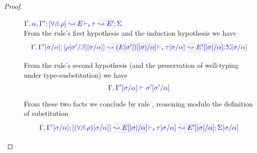 \begin{proof}
\begin{description}
\item[]\quad$\dmres{\tenv,\alpha,\tenv'}{\tall{\beta}{\rulet}}{E}{\type}{E'}{\Sigma}$\\

  From the rule's first hypothesis and the induction hypothesis we have 
\begin{equation*}
  \dmres{\tenv,\tenv'[\suty/\alpha]}{\rulet[\suty'/\beta][\suty/\alpha]}{(E |\suty'|)[|\suty|/\alpha]}{\type[\suty/\alpha]}{E'[|\suty|/\alpha]}{\Sigma[\suty/\alpha]}
\end{equation*}

  From the rule's second hypothesis (and the preservation of well-typing under type-susbstitution) we have
\begin{equation*}
{\color{blue} \Gamma,\Gamma'[\sigma/\alpha] \vdash\sigma'[\sigma'/\alpha]}
\end{equation*}

  From these two facts we conclude by rule , reasoning modulo
  the definition of substitution
\begin{equation*}
  \dmres{\tenv,\tenv'[\suty/\alpha]}{(\tall{\beta}{\rulet})[\suty/\alpha]}{E[|\suty|/\alpha]}{\type[\suty/\alpha]}{E'[|\suty|/\alpha]}{\Sigma[\suty/\alpha]}
\end{equation*}
\end{description}
\end{proof}



